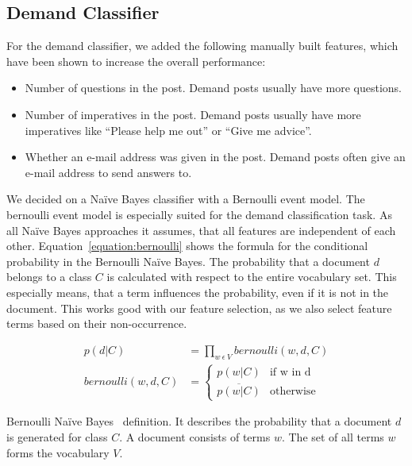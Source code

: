 \subsection{Demand Classifier}
For the demand classifier, we added the following manually built features, which have been shown to increase the overall performance:
\begin{itemize}
	\item Number of questions in the post. Demand posts usually have more questions.
	\item Number of imperatives in the post. Demand posts usually have more imperatives like ``Please help me out'' or ``Give me advice''.
	\item Whether an e-mail address was given in the post. Demand posts often give an e-mail address to send answers to.
\end{itemize}

We decided on a Na\"{i}ve Bayes classifier with a Bernoulli event model.
The bernoulli event model is especially suited for the demand classification task.
As all Na\"{i}ve Bayes approaches it assumes, that all features are independent of each other.
Equation~\ref{equation:bernoulli} shows the formula for the conditional probability in the Bernoulli Na\"{i}ve Bayes.
The probability that a document $d$ belongs to a class $C$ is calculated with respect to the entire vocabulary set.
This especially means, that a term influences the probability, even if it is not in the document.
This works good with our feature selection, as we also select feature terms based on their non-occurrence.

\captionsetup{singlelinecheck=off}
\begin{equationBlock}
\begin{align*}
	p(d|C) &= \prod_{w~\epsilon~V} bernoulli(w, d, C) \\
	bernoulli(w, d, C) &=
	\begin{cases}
		p(w|C) 					&\text{if w in d}\\
		\overline{p(w|C)} 		&\text{otherwise}
	\end{cases}
	\end{align*}
	\caption{
		Bernoulli Na\"{i}ve Bayes~\cite{mccallum1998comparison} definition.
		It describes the probability that a document $d$ is generated for class $C$.
		A document consists of terms $w$.
		The set of all terms $w$ forms the vocabulary $V$.
	}
	\label{equation:bernoulli}
\end{equationBlock}


